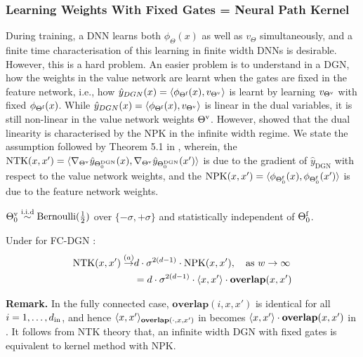 \subsubsection{Learning Weights With Fixed Gates = Neural Path Kernel}\label{sec:fixedgates}
During training, a DNN learns both $\phi_{\Theta}(x)$ as well as $v_{\Theta}$ simultaneously, and a finite time characterisation of this learning in finite width DNNs is desirable. However, this is a hard problem. An easier problem is to understand in a DGN, how the weights in the value network are learnt when the gates are fixed in the feature network, i.e., how $\hat{y}_{DGN}(x)=\langle \phi_{\Theta^{\textrm{f}}}(x),v_{{\Theta}^{\text{v}}}\rangle$ is learnt by learning $v_{{\Theta}^{\text{v}}}$ with fixed $\phi_{\Theta^{\textrm{f}}}(x)$. While  $\hat{y}_{DGN}(x)=\langle \phi_{\Theta^{\textrm{f}}}(x),v_{{\Theta}^{\text{v}}}\rangle$ is linear in the dual variables, it is still non-linear in the value network weights ${\Theta}^{\text{v}}$. However, \cite{npk} showed that the dual linearity is characterised by the NPK in the infinite width regime. We state the assumption followed by Theorem 5.1 in \citep{npk}, wherein, the $\text{NTK}(x,x')=\langle \nabla_{{\Theta}^{\text{v}}}\hat{y}_{\Theta^{\text{DGN}}_0}(x),\nabla_{{\Theta}^{\text{v}}}\hat{y}_{\Theta^{\text{DGN}}_0}(x') \rangle$ is due to the gradient of $\hat{y}_{\text{DGN}}$ with respect to the value network weights, and the $\text{NPK}(x,x')=\langle \phi_{\Theta^{\textrm{f}}_0}(x),\phi_{\Theta^{\textrm{f}}_0}(x')\rangle$ is due to the feature network weights.

\begin{assumption}\label{assmp:main}
${\Theta}^{\text{v}}_0\stackrel{\text{i.i.d}}\sim\text{Bernoulli}(\frac12)$ over $\{-{\sigma},+{\sigma}\}$ and statistically independent of $\Theta^{\textrm{f}}_0$.
\end{assumption}

\begin{theorem}
\label{th:fcprev} Under  for FC-DGN : 
\begin{align*}
\text{NTK}(x,x') \stackrel{(a)}\rightarrow &d \cdot \sigma^{2(d-1)} \cdot \text{NPK}(x,x'), \quad\text{as}\,\, w\rightarrow \infty \\
					     & = d \cdot \sigma^{2(d-1)}\cdot\langle x,x'\rangle\cdot \textbf{overlap}(x,x')
\end{align*}
\end{theorem} 
\textbf{Remark.} In the fully connected case, $\textbf{overlap}(i,x,x')$ is identical for all $i=1,\ldots,d_{\text{in}}$, and hence $\langle x,x'\rangle_{\textbf{overlap}(\cdot,x,x')}$ in  becomes $\langle x,x'\rangle\cdot \textbf{overlap}(x,x')$ in . It follows from NTK theory that, an infinite width DGN with fixed gates is equivalent to kernel method with NPK.
